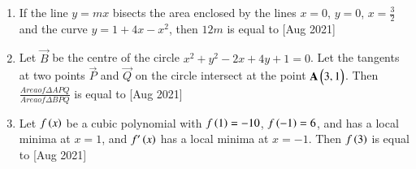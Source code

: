 \documentclass[journal]{IEEEtran}
\begin{document}
\begin{enumerate}
	$\cbrak{A = \myvec{a & b \\ 0 & d}: a,b,d \in \{-1,0,1\} and \brak{I-A}^{3} = I - A^{3}}$
	\hfill [Aug 2021]
	\item 
	If the line $y = mx$ bisects the area enclosed by the lines $x = 0$, $y = 0$, $x = \frac{3}{2}$ and the curve $y = 1 + 4x - x^{2}$, then $12m$ is equal to 
	\hfill [Aug 2021]
	\item 
	Let $\vec{B}$ be the centre of the circle $x^2+ y^2 - 2x + 4y + 1 = 0$. Let the tangents at two points $\vec{P}$ and $\vec{Q}$ on the circle intersect at the point $\mathbf{A}\begin{pmatrix}3 , 1\end{pmatrix}$. Then $\frac{Area of \Delta APQ}{Area of \Delta BPQ}$ is equal to
	\hfill [Aug 2021]
	\item 
 	Let $f\left(x\right)$ be a cubic polynomial with $f\left(1\right) = -10$, $f\left(-1\right) = 6$, and has a local minima at $x = 1$, and $f^{\prime}\left(x\right)$ has a local minima at $x = -1$. Then $f\left(3\right)$ is equal to 
 	\hfill [Aug 2021]
\end{enumerate}
\end{document}
